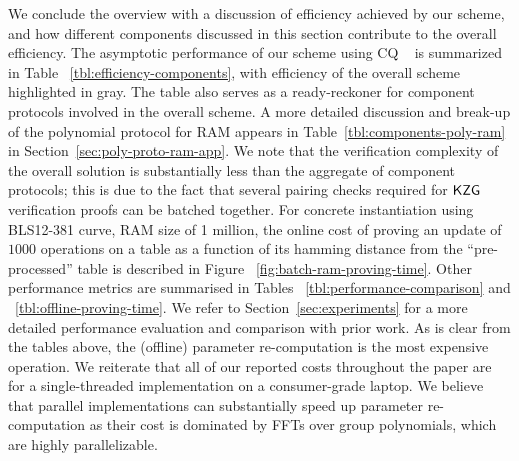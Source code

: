  We conclude the overview with a discussion of efficiency achieved by our scheme, and
how different components discussed in this section contribute to the overall efficiency. The asymptotic performance
of our scheme using CQ ~\cite{EPRINT:EagFioGab22} is summarized in Table ~\ref{tbl:efficiency-components}, with
efficiency of the overall scheme highlighted in gray. The table also serves as a ready-reckoner for component protocols
involved in the overall scheme. A more detailed discussion and break-up of the polynomial protocol for RAM
appears in Table~\ref{tbl:components-poly-ram} in Section~\ref{sec:poly-proto-ram-app}. We note that the verification complexity of the overall solution is substantially
less than the aggregate of component protocols; this is due to the fact that several pairing checks required for
$\mathsf{KZG}$ verification proofs can be batched together. For concrete instantiation using BLS12-381 curve, RAM size
of 1 million, the online cost of proving an update of $1000$ operations on a table as a function of its
hamming distance from the ``pre-processed'' table is described in Figure ~\ref{fig:batch-ram-proving-time}.
Other performance metrics are summarised in Tables ~\ref{tbl:performance-comparison} and ~\ref{tbl:offline-proving-time}.
We refer to Section~\ref{sec:experiments} for a more detailed performance evaluation and comparison with prior work.
As is clear from the tables above, the (offline) parameter re-computation is the most expensive operation.
We reiterate that all of our reported costs throughout the paper are for a single-threaded implementation on a consumer-grade laptop.
We believe that parallel implementations can
substantially speed up parameter re-computation as their cost is dominated by FFTs over group polynomials, which
are highly parallelizable.

\smallskip

